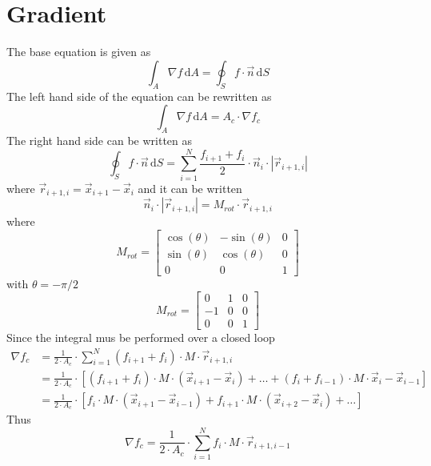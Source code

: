 \section{Gradient}
The base equation is given as
\begin{equation}
    \int_A \nabla f \, \mathrm{d}A = \oint_S f \cdot \vec{n} \, \mathrm{d}S
\end{equation}
The left hand side of the equation can be rewritten as
\begin{equation}
    \int_A \nabla f \, \mathrm{d}A = A_c \cdot \nabla f_c
\end{equation}
The right hand side can be written as
\begin{equation}
    \oint_S f \cdot \vec{n} \, \mathrm{d}S = \sum_{i = 1}^N \frac{f_{i + 1} + f_i}{2} \cdot \vec{n}_i \cdot |\vec{r}_{i+1, i}|
\end{equation}
where $\vec{r}_{i+1, i} = \vec{x}_{i + 1} - \vec{x}_i$ and it can be written
\begin{equation}
    \vec{n}_i \cdot |\vec{r}_{i+1, i}| = M_{rot} \cdot \vec{r}_{i+1, i}
\end{equation}
where
\begin{equation}
    M_{rot} = 
    \begin{bmatrix}
       \cos(\theta) & -\sin(\theta) & 0 \\
       \sin(\theta) &  \cos(\theta) & 0 \\
       0 & 0 & 1
     \end{bmatrix}
\end{equation}
with $\theta = -\pi /2$
\begin{equation}
    M_{rot} = 
    \begin{bmatrix}
       0 & 1 & 0 \\
       -1 &  0 & 0 \\
       0 & 0 & 1
     \end{bmatrix}
\end{equation}
Since the integral mus be performed over a closed loop
\begin{equation}
    \begin{split}
         \nabla f_c &= \frac{1}{2 \cdot A_c} \cdot \sum_{i = 1}^N (f_{i + 1} + f_i) \cdot M \cdot \vec{r}_{i + 1,i} \\
         &= \frac{1}{2 \cdot A_c} \cdot \left[ (f_{i + 1} + f_i) \cdot M \cdot (\vec{x}_{i + 1} - \vec{x}_i) + \dots + (f_{i} + f_{i - 1}) \cdot M \cdot \vec{x}_{i} - \vec{x}_{i - 1} \right] \\
         &= \frac{1}{2 \cdot A_c} \cdot \left[ f_i \cdot M \cdot (\vec{x}_{i + 1} - \vec{x}_{i - 1}) + f_{i + 1} \cdot M \cdot (\vec{x}_{i + 2} - \vec{x}_{i}) + \dots \right]
    \end{split}
\end{equation}
Thus
\begin{equation}
    \nabla f_c = \frac{1}{2 \cdot A_c} \cdot \sum_{i = 1}^N f_i \cdot M \cdot \vec{r}_{i + 1,i - 1}
\end{equation}

